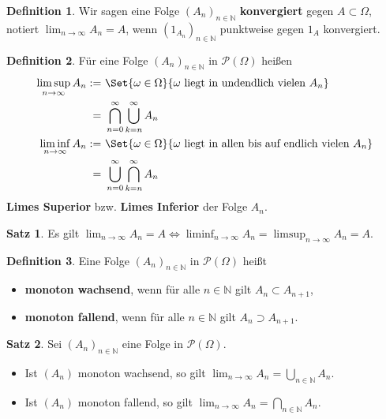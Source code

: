 \documentclass[a4paper,10pt,landscape]{article}
\newcommand{\N}{\mathbb{N}}
\newcommand{\PS}{\mathcal{P}} %
\newcommand{\PSO}{\PS(\Omega)} %
\theoremstyle{definition}
\newtheorem*{defn}{Definition}
\newtheorem*{satz}{Satz}
\theoremstyle{remark}
\renewcommand{\emph}[1]{\textcolor{Emph}{\bf{#1}}}
\begin{document}
\begin{multicols}{3}
\begin{defn}
  Wir sagen eine Folge $(A_n)_{n \in \N}$ \emph{konvergiert} gegen $A \subset \Omega$, notiert $\lim_{n \to \infty} A_n = A$, wenn $(1_{A_n})_{n \in \N}$ punktweise gegen $1_A$ konvergiert.
\end{defn}

\begin{defn}
  Für eine Folge $(A_n)_{n \in \N}$ in $\PS(\Omega)$ heißen
  \begin{align*}
    \limsup_{n \to \infty} A_n :=&~\Set{ \omega \in \Omega }{ \omega \text{ liegt in undendlich vielen } A_n } \\
    =&~\bigcap_{n = 0}^\infty \bigcup_{k = n}^\infty A_n \\
    \liminf_{n \to \infty} A_n :=&~\Set{ \omega \in \Omega }{ \omega \text{ liegt in allen bis auf endlich vielen } A_n } \\
    =&~\bigcup_{n = 0}^\infty \bigcap_{k = n}^\infty A_n
  \end{align*}
  \emph{Limes Superior} bzw. \emph{Limes Inferior} der Folge $A_n$.
\end{defn}


\begin{satz}
  Es gilt $\lim_{n \to \infty} A_n = A \iff \liminf_{n \to \infty} A_n = \limsup_{n \to \infty} A_n = A$.
\end{satz}

\begin{defn}
  Eine Folge $(A_n)_{n \in \N}$ in $\PSO$ heißt
  \begin{itemize}
    \item \emph{monoton wachsend}, wenn für alle $n \in \N$ gilt $A_n \subset A_{n+1}$,
    \item \emph{monoton fallend}, wenn für alle $n \in \N$ gilt $A_n \supset A_{n+1}$.
  \end{itemize}
\end{defn}

\begin{satz}
  Sei $(A_n)_{n \in \N}$ eine Folge in $\PSO$.
  \begin{itemize}
    \item Ist $(A_n)$ monoton wachsend, so gilt $\lim_{n \to \infty} A_n = \bigcup_{n \in \N} A_n$.
    \item Ist $(A_n)$ monoton fallend, so gilt $\lim_{n \to \infty} A_n = \bigcap_{n \in \N} A_n$.
  \end{itemize}
\end{satz}


\end{multicols}
\end{document}
